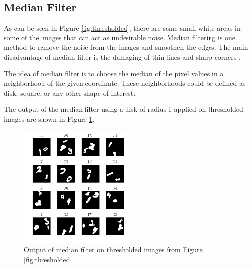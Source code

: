 \documentclass[letterpaper, 10 pt, conference]{ieeeconf}  %
\begin{document}
\subsection{Median Filter}
As can be seen in Figure \ref{fig:thresholded}, there are some small white areas in some of the images that can act as undesirable noise. Median filtering is one method to remove the noise from the images and smoothen the edges. The main disadvantage of median filter is the damaging of thin lines and sharp corners \cite{bovik2009essential}. 

The idea of median filter is to choose the median of the pixel values in a neighborhood of the given coordinate. These neighborhoods could be defined as disk, square, or any other shape of interest.


The output of the median filter using a disk of radius 1 applied on thresholded images are shown in Figure \ref{fig:thresholdmed}.
\begin{figure}[h]
	\begin{center}
		\includegraphics[width=0.5\textwidth]{figures/thresholdmedDataset.pdf}  %
		\caption{Output of median filter on thresholded images from Figure \ref{fig:thresholded}}
		\label{fig:thresholdmed}
	\end{center}
\end{figure}
\end{document}
